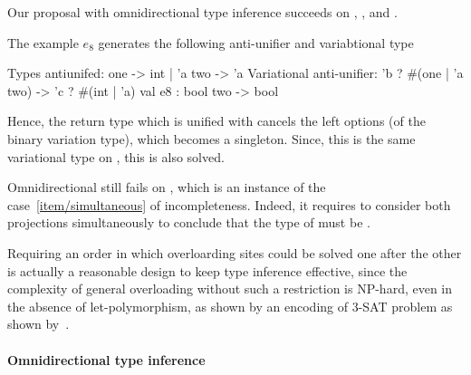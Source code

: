 \documentclass[acmsmall,screen,nonacm]{acmart}
\begin{document}
Our proposal with omnidirectional type inference succeeds
on , , and .
\begin{version}{\Draft}
The example $e_8$ generates the following anti-unifier and variabtional
type
\begin{program}
Types antiunifed: one -> int | 'a two -> 'a
Variational anti-unifier: {'b ? {#(one | 'a two)}} -> {'c ? {#(int | 'a)}}
val e8 : bool two -> bool
\end{program}
Hence, the return type which is unified with  cancels the left
options (of the binary variation type), which becomes a singleton.  Since,
this is the same variational type on , this is also solved.
\end{version}

Omnidirectional still fails on , which is an instance of the
case~\ref {item/simultaneous} of incompleteness. Indeed, it requires to
consider both projections simultaneously to conclude that the type of
 must be .

Requiring an order in which overloarding sites could be solved one after the
other is actually a reasonable design to keep type inference effective,
since the complexity of general overloading without such a restriction is
NP-hard, even in the absence of let-polymorphism, as shown by an encoding of
3-SAT problem as shown by~\citet
{Chargueraud-Bodin-Dunfield-Riboulet/jfla2025}.

\paragraph{Omnidirectional type inference}
\end{document}
